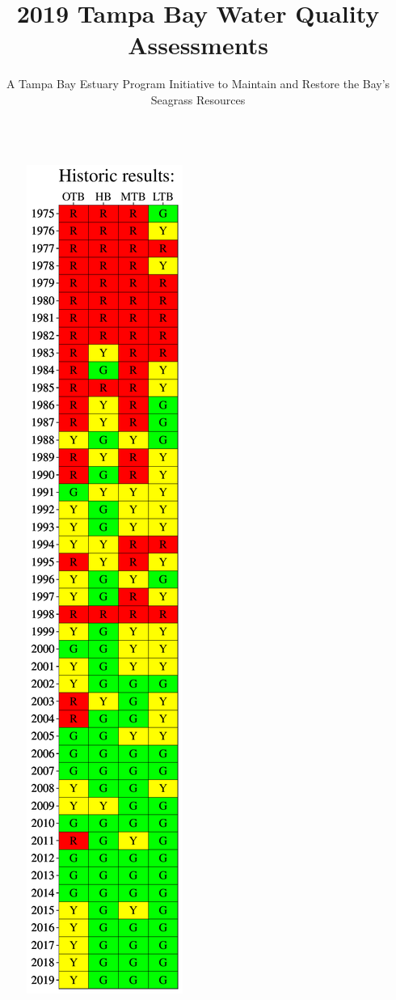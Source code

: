 \documentclass[final,t]{beamer}\usepackage[]{graphicx}\usepackage[]{color}
\title{\Large 2019 Tampa Bay Water Quality Assessments}
\author{\normalsize A Tampa Bay Estuary Program Initiative to Maintain and Restore the Bay's Seagrass Resources}
\begin{document}
\begin{frame}

\vspace{-0.4cm} %
\begin{columns}[t]

\begin{column}{.2\linewidth}

\vspace{-0.2in}


\begin{figure}
\centerline{\includegraphics[trim = 0cm 0cm 0cm 0cm, width=1.1\linewidth]{figure/attainmat.pdf}}

\end{figure}
\end{column}
\end{columns}
\end{frame}
\end{document}
